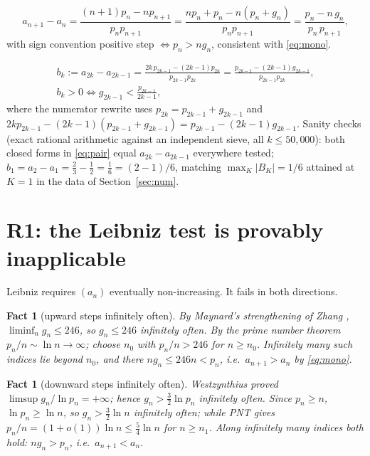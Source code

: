 \documentclass[11pt]{article}
\newtheorem{fact}[theorem]{Fact}
\theoremstyle{definition}
\begin{document}
\begin{equation}\label{eq:step}
a_{n+1}-a_n=\frac{(n{+}1)p_n-np_{n+1}}{p_np_{n+1}}
=\frac{np_n+p_n-n(p_n+g_n)}{p_np_{n+1}}
=\frac{p_n-n\,g_n}{p_n\,p_{n+1}},
\end{equation}
with sign convention positive step $\iff p_n>ng_n$, consistent with \eqref{eq:mono}.

\begin{equation}\label{eq:pair}
\begin{gathered}
b_k:=a_{2k}-a_{2k-1}
=\frac{2k\,p_{2k-1}-(2k-1)p_{2k}}{p_{2k-1}p_{2k}}
=\frac{p_{2k-1}-(2k-1)g_{2k-1}}{p_{2k-1}p_{2k}},\\[4pt]
b_k>0\iff g_{2k-1}<\frac{p_{2k-1}}{2k-1},
\end{gathered}
\end{equation}
where the numerator rewrite uses $p_{2k}=p_{2k-1}+g_{2k-1}$ and $2kp_{2k-1}-(2k-1)(p_{2k-1}+g_{2k-1})=p_{2k-1}-(2k-1)g_{2k-1}$.
Sanity checks (exact rational arithmetic against an independent sieve, all $k\le 50{,}000$): both closed forms in \eqref{eq:pair} equal $a_{2k}-a_{2k-1}$ everywhere tested; $b_1=a_2-a_1=\tfrac23-\tfrac12=\tfrac16=(2-1)/6$, matching $\max_K|B_K|=1/6$ attained at $K=1$ in the data of Section~\ref{sec:num}.

\section{R1: the Leibniz test is provably inapplicable}\label{sec:r1}

Leibniz requires $(a_n)$ eventually non-increasing. It fails in both directions.

\begin{fact}[upward steps infinitely often]\label{fac:up}
By Maynard's strengthening of Zhang \cite{Zh14,Ma15,Po14}, $\liminf_n g_n\le 246$, so $g_n\le 246$ infinitely often. By the prime number theorem $p_n/n\sim\ln n\to\infty$; choose $n_0$ with $p_n/n>246$ for $n\ge n_0$. Infinitely many such indices lie beyond $n_0$, and there $ng_n\le246n<p_n$, i.e.\ $a_{n+1}>a_n$ by \eqref{eq:mono}.
\end{fact}

\begin{fact}[downward steps infinitely often]\label{fac:down}
Westzynthius \cite{We31} proved $\limsup g_n/\ln p_n=+\infty$; hence $g_n>\tfrac32\ln p_n$ infinitely often. Since $p_n\ge n$, $\ln p_n\ge\ln n$, so $g_n>\tfrac32\ln n$ infinitely often; while PNT gives $p_n/n=(1+o(1))\ln n\le\tfrac54\ln n$ for $n\ge n_1$. Along infinitely many indices both hold: $ng_n>p_n$, i.e.\ $a_{n+1}<a_n$.
\end{fact}
\end{document}
